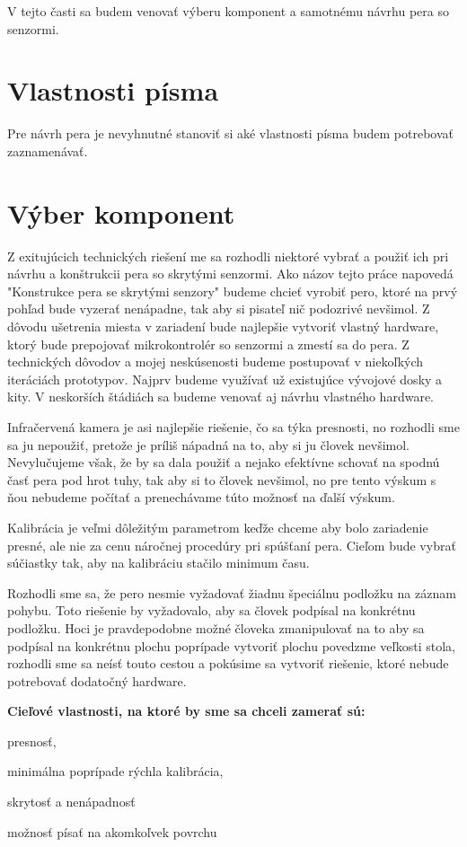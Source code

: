 V tejto časti sa budem venovať výberu komponent a samotnému návrhu pera so senzormi.

\section{Vlastnosti písma}

Pre návrh pera je nevyhnutné stanoviť si aké vlastnosti písma budem potrebovať zaznamenávať. 

\section{Výber komponent}

Z exitujúcich technických riešení me sa rozhodli niektoré vybrať a použiť ich pri návrhu a konštrukcii pera so skrytými senzormi. Ako názov tejto práce napovedá "Konstrukce pera se skrytými senzory" budeme chcieť vyrobiť pero, ktoré na prvý pohľad bude vyzerať nenápadne, tak aby si pisateľ nič podozrivé nevšimol. Z dôvodu ušetrenia miesta v zariadení bude najlepšie vytvoriť vlastný hardware, ktorý bude prepojovať mikrokontrolér so senzormi a zmestí sa do pera. Z technických dôvodov a mojej neskúsenosti budeme postupovať v niekoľkých iteráciách prototypov. Najprv budeme využívať už existujúce vývojové dosky a kity. V neskorších štádiách sa budeme venovať aj návrhu vlastného hardware. 

Infračervená kamera je asi najlepšie riešenie, čo sa týka presnosti, no rozhodli sme sa ju nepoužiť, pretože je príliš nápadná na to, aby si ju človek nevšimol. Nevylučujeme však, že by sa dala použiť a nejako efektívne schovať na spodnú časť pera pod hrot tuhy, tak aby si to človek nevšimol, no pre tento výskum s ňou nebudeme počítať a prenechávame túto možnosť na ďalší výskum.

Kalibrácia je veľmi dôležitým parametrom keďže chceme aby bolo zariadenie presné, ale nie za cenu náročnej procedúry pri spúšťaní pera. Cieľom bude vybrať súčiastky tak, aby na kalibráciu stačilo minimum času. 

Rozhodli sme sa, že pero nesmie vyžadovať žiadnu špeciálnu podložku na záznam pohybu. Toto riešenie by vyžadovalo, aby sa človek podpísal na konkrétnu podložku. Hoci je pravdepodobne možné človeka zmanipulovať na to aby sa podpísal na konkrétnu plochu poprípade vytvoriť plochu povedzme veľkosti stola, rozhodli sme sa neísť touto cestou a pokúsime sa vytvoriť riešenie, ktoré nebude potrebovať dodatočný hardware. 

\textbf{Cieľové vlastnosti, na ktoré by sme sa chceli zamerať sú:}
\begin{description}
	\item{presnosť, }
	\item{minimálna poprípade rýchla kalibrácia, }
	\item{skrytosť a nenápadnosť}
	\item{možnosť písať na akomkoľvek povrchu}
\end{description}

